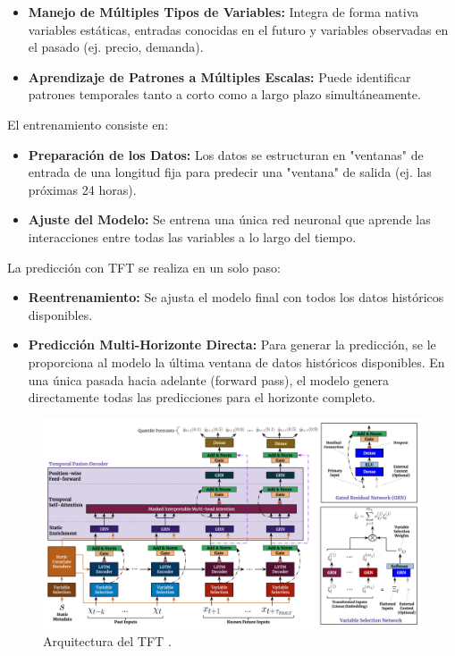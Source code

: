 \begin{itemize}
    
    \item \textbf{Manejo de Múltiples Tipos de Variables:} Integra de forma nativa variables estáticas, entradas conocidas en el futuro y variables observadas en el pasado (ej. precio, demanda).
    \item \textbf{Aprendizaje de Patrones a Múltiples Escalas:} Puede identificar patrones temporales tanto a corto como a largo plazo simultáneamente.
\end{itemize}
%
%
%
El entrenamiento consiste en:
%
%
%
\begin{itemize}
    \item \textbf{Preparación de los Datos:} Los datos se estructuran en "ventanas" de entrada de una longitud fija para predecir una "ventana" de salida (ej. las próximas 24 horas).
    \item \textbf{Ajuste del Modelo:} Se entrena una única red neuronal que aprende las interacciones entre todas las variables a lo largo del tiempo.
\end{itemize}
%
%
%
La predicción con TFT se realiza en un solo paso:
%
%
%
\begin{itemize}
    \item \textbf{Reentrenamiento:} Se ajusta el modelo final con todos los datos históricos disponibles.
    \item \textbf{Predicción Multi-Horizonte Directa:} Para generar la predicción, se le proporciona al modelo la última ventana de datos históricos disponibles. En una única pasada hacia adelante (forward pass), el modelo genera directamente todas las predicciones para el horizonte completo.
\end{itemize}
%
%
%
\begin{figure}[H]
    \centering
    \includegraphics[width=0.7\linewidth]{figuras/TFTarquitectura.png}
    \caption[Arquitectura de TFT]{Arquitectura del TFT \cite{TFT}.}
    \label{fig:placeholder}
\end{figure}
